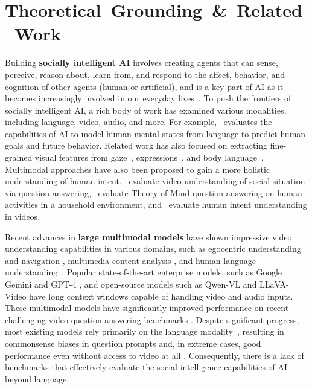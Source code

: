 \section{\mbox{Theoretical Grounding \& Related Work}}

Building \textbf{socially intelligent AI} involves creating agents that can sense, perceive, reason about, learn from, and respond to the affect, behavior, and cognition of other agents (human or artificial), and is a key part of AI as it becomes increasingly involved in our everyday lives~\cite{mathur-etal-2024-advancing}. To push the frontiers of socially intelligent AI, a rich body of work has examined various modalities, including language, video, audio, and more. For example,~\citet{gandhiUnderstandingSocialReasoning2023} evaluates the capabilities of AI to model human mental states from language to predict human goals and future behavior. Related work has also focused on extracting fine-grained visual features from gaze~\citep{singhCombiningGazeAI2020, zhangHumanGazeAssisted2020}, expressions~\citep{zheng-etal-2023-facial, zheng2024unimodal}, and body language~\citep{xu-etal-2024-llm,ozaki2024bqabodylanguagequestion,yoon2019robots, liu2022learning}. Multimodal approaches have also been proposed to gain a more holistic understanding of human intent.~\citet{siq2} evaluate video understanding of social situation via question-answering,~\citet{jin-etal-2024-mmtom} evaluate Theory of Mind question answering on human activities in a household environment, and~\citet{li2023intentqa} evaluate human intent understanding in videos. 

Recent advances in \textbf{large multimodal models} have shown impressive video understanding capabilities in various domains, such as egocentric understanding and navigation \cite{mangalam2023egoschema}, multimedia content analysis \cite{liVideoVistaVersatileBenchmark2024a}, and human language understanding~\citep{liang2024hemm,tsai2019multimodal}. Popular state-of-the-art enterprise models, such as Google Gemini \cite{team2024gemini} and GPT-4 \cite{achiam2023gpt}, and open-source models such as Qwen-VL 
\citep{qwen2.5-VL} and LLaVA-Video \cite{zhang2024video} have long context windows capable of handling video and audio inputs. These multimodal models have significantly improved performance on recent challenging video question-answering benchmarks \cite{nagrani2024neptune, mangalam2023egoschema, rawal2024cinepile, fu2024video}. Despite significant progress, most existing models rely primarily on the language modality~\citep{liang2024hemm}, resulting in commonsense biases in question prompts and, in extreme cases, good performance even without access to video at all \cite{min2024morevqa}. Consequently, there is a lack of benchmarks that effectively evaluate the social intelligence capabilities of AI beyond language.

